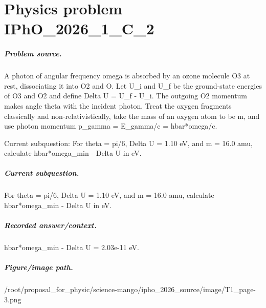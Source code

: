 
\chapter{Physics problem IPhO\_2026\_1\_C\_2}
\label{ch:IPhO2026Problems_problem_IPhO_2026_1_C_2}

\paragraph{Problem source.}
A photon of angular frequency omega is absorbed by an ozone molecule O3 at rest,
dissociating it into O2 and O.  Let U\_i and U\_f be the ground-state energies of
O3 and O2 and define Delta U = U\_f - U\_i.  The outgoing O2 momentum makes angle
theta with the incident photon.  Treat the oxygen fragments classically and
non-relativistically, take the mass of an oxygen atom to be m, and use photon
momentum p\_gamma = E\_gamma/c = hbar*omega/c.

Current subquestion:
For theta = pi/6, Delta U = 1.10 eV, and m = 16.0 amu, calculate hbar*omega\_min - Delta U in eV.

\paragraph{Current subquestion.}
For theta = pi/6, Delta U = 1.10 eV, and m = 16.0 amu, calculate hbar*omega\_min - Delta U in eV.

\paragraph{Recorded answer/context.}
hbar*omega\_min - Delta U = 2.03e-11 eV.

\paragraph{Figure/image path.}
/root/proposal\_for\_physic/science-mango/ipho\_2026\_source/image/T1\_page-3.png

